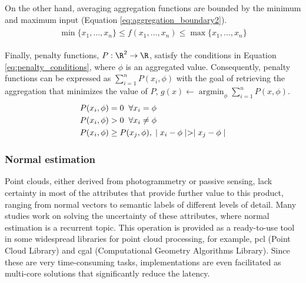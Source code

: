 On the other hand, averaging aggregation functions are bounded by the minimum and maximum input (Equation \ref{eq:aggregation_boundary2}).
\begin{gather}
    \label{eq:aggregation_boundary2}
    \begin{aligned}
        \min{\{x_1,...,x_n\}} \leq f(x_1,...,x_n) \leq \max{\{x_1,...,x_n\}}
    \end{aligned}
\end{gather}

Finally, penalty functions, $P : \R^{2} \rightarrow \R$, satisfy the conditions in Equation \ref{eq:penalty_conditions}, where $\phi$ is an aggregated value. Consequently, penalty functions can be expressed as $\sum_{i=1}^{n} P(x_i, \phi)$ with the goal of retrieving the aggregation that minimizes the value of $P$, $g(x) \gets \operatorname*{argmin}_\phi \sum_{i=1}^{n} P(x, \phi)$.
\begin{gather}
    \label{eq:penalty_conditions}
    \begin{aligned}
        &P(x_i,\phi) = 0 \hspace{2mm} \forall x_i = \phi\\
        &P(x_i,\phi) > 0 \hspace{2mm} \forall x_i \neq \phi\\
        &P(x_i,\phi) \ge P(x_j,\phi), \hspace{1mm}\mid x_i - \phi \mid > \mid x_j - \phi \mid\\
    \end{aligned}
\end{gather}

\subsubsection{Normal estimation}

Point clouds, either derived from photogrammetry or passive sensing, lack certainty in most of the attributes that provide further value to this product, ranging from normal vectors to semantic labels of different levels of detail. Many studies work on solving the uncertainty of these attributes, where normal estimation is a recurrent topic. This operation is provided as a ready-to-use tool in some widespread libraries for point cloud processing, for example, \acrshort{pcl} (Point Cloud Library) and \acrshort{cgal} (Computational Geometry Algorithms Library). Since these are very time-consuming tasks, implementations are even facilitated as multi-core solutions that significantly reduce the latency. 


